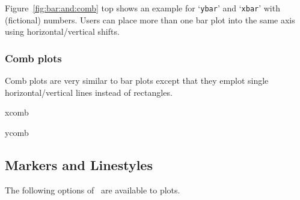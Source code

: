 Figure~\ref{fig:bar:and:comb} top shows an example for `\texttt{ybar}' and `\texttt{xbar}' with (fictional) numbers. Users can place more than one bar plot into the same axis using horizontal/vertical shifts.

\subsubsection{Comb plots}
Comb plots are very similar to bar plots except that they emplot single horizontal/vertical lines instead of rectangles.

\begin{plottype}{xcomb}
\end{plottype}

\begin{plottype}{ycomb}
\end{plottype}

\subsection{Markers and Linestyles}
\label{sec:markers}%
The following options of \Tikz\ are available to plots.
